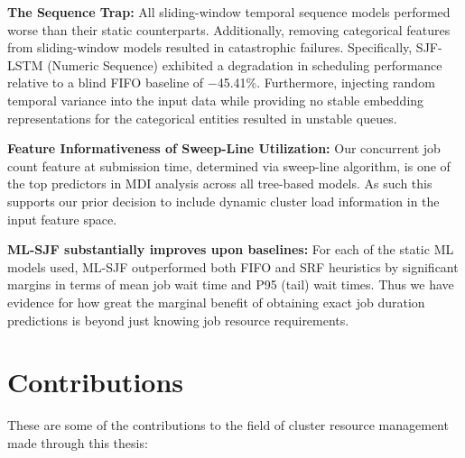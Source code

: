 \textbf{The Sequence Trap:} All sliding-window temporal sequence models performed worse than their static counterparts. Additionally, removing categorical features from sliding-window models resulted in catastrophic failures. Specifically, SJF-LSTM (Numeric Sequence) exhibited a degradation in scheduling performance relative to a blind FIFO baseline of $-$45.41\%. Furthermore, injecting random temporal variance into the input data while providing no stable embedding representations for the categorical entities resulted in unstable queues.

\textbf{Feature Informativeness of Sweep-Line Utilization:} Our concurrent job count feature at submission time, determined via sweep-line algorithm, is one of the top predictors in MDI analysis across all tree-based models. As such this supports our prior decision to include dynamic cluster load information in the input feature space.

\textbf{ML-SJF substantially improves upon baselines:} For each of the static ML models used, ML-SJF outperformed both FIFO and SRF heuristics by significant margins in terms of mean job wait time and P95 (tail) wait times. Thus we have evidence for how great the marginal benefit of obtaining exact job duration predictions is beyond just knowing job resource requirements.

\section{Contributions}

These are some of the contributions to the field of cluster resource management made through this thesis:

